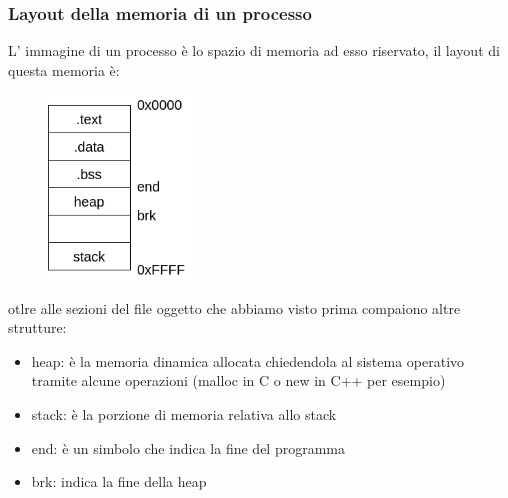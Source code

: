 \subsubsection{Layout della memoria di un processo}
L' immagine di un processo è lo spazio di memoria ad esso riservato, il layout di questa memoria è:
\begin{figure}[H]
    \centering
    \includegraphics[width=150px]{images/25_Programmazione_C/memory_layout.png}
\end{figure}
otlre alle sezioni del file oggetto che abbiamo visto prima compaiono altre strutture:
\begin{itemize}
    \item heap: è la memoria dinamica allocata chiedendola al sistema operativo tramite alcune operazioni (malloc in C o new in C++ per esempio)
    \item stack: è la porzione di memoria relativa allo stack
    \item end: è un simbolo che indica la fine del programma
    \item brk: indica la fine della heap
\end{itemize}
